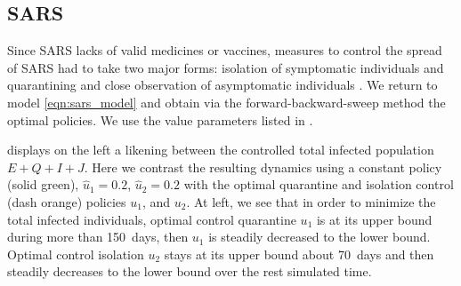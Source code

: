 \subsection*{SARS}
  Since SARS lacks of valid medicines or vaccines, measures to control the 
spread of SARS had to take two major forms: isolation of symptomatic 
individuals and quarantining and close observation of asymptomatic 
individuals \cite{who_sars}. We return to model \eqref{eqn:sars_model} and 
obtain via the forward-backward-sweep method the optimal policies. We use the 
value parameters listed in .

   displays on the left a likening between the 
controlled total infected population $E + Q + I + J$. Here we contrast the 
resulting dynamics using a constant policy (solid green), 
$\widehat{u}_1 =\num{0.2}$, $\widehat{u}_2 = \num{0.2}$ with the optimal 
quarantine and isolation control (dash orange) policies $u_1$, and $u_2$. At 
left, we see that in order to minimize the total infected individuals, optimal 
control quarantine $u_1$ is at its upper bound during more than \SI{150}{days}, 
then $u_1$ is steadily decreased to the lower bound. Optimal control isolation 
$u_2$ stays at its  upper bound about \SI{70}{days} and then steadily decreases 
to the lower bound over the rest simulated time.

